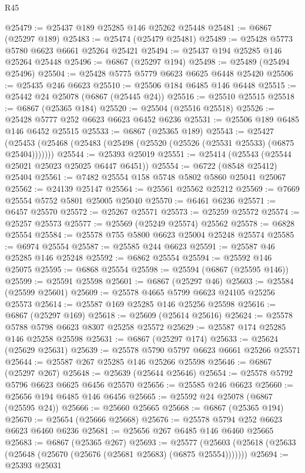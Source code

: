 \begin{lexlean}{R45}
\begin{coremodule}
{@25479 := @25437 @189 @25285 @146 @25262 @25448
@25481 := @6867 (@25297 @189)
@25483 := @25474 (@25479 @25481)
@25489 := @25428 @5773 @5780 @6623 @6661 @25264 @25421
@25494 := @25437 @194 @25285 @146 @25264 @25448
@25496 := @6867 (@25297 @194)
@25498 := @25489 (@25494 @25496)
@25504 := @25428 @5775 @5779 @6623 @6625 @6448 @25420
@25506 := @25435 @246 @6623
@25510 := @25506 @184 @6485 @146 @6448
@25515 := @25442 @24 @25078 (@6867 (@25445 @24))
@25516 := @25510 @25515
@25518 := @6867 (@25365 @184)
@25520 := @25504 (@25516 @25518)
@25526 := @25428 @5777 @252 @6623 @6623 @6452 @6236
@25531 := @25506 @189 @6485 @146 @6452 @25515
@25533 := @6867 (@25365 @189)
@25543 := @25427
    (@25453 (@25468 (@25483 (@25498 (@25520 (@25526 (@25531 @25533) (@6875 @25404)))))))
@25544 := @25393 @25019
@25551 := @25414 (@25543 (@25544 @25021 @25023 @25025 @6447 @6451))
@25554 := @6722 (@8548 @25412) @25404
@25561 := @7482 @25554 @158 @5748 @5802 @5860 @25041 @25067
@25562 := @24139 @25147
@25564 := @25561 @25562 @25212
@25569 := @7669 @25554 @5752 @5801 @25005 @25040
@25570 := @6461 @6236
@25571 := @6457 @25570
@25572 := @25267 @25571
@25573 := @25259 @25572
@25574 := @25257 @25573
@25577 := @25569 (@25249 @25574) @25562
@25578 := @6828 @25554
@25584 := @25578 @755 @5800 @6623 @25004 @25248 @25574
@25585 := @6974 @25554
@25587 := @25585 @244 @6623
@25591 := @25587 @46 @25285 @146 @25248
@25592 := @6862 @25554
@25594 := @25592 @146 @25075
@25595 := @6868 @25554
@25598 := @25594 (@6867 (@25595 @146))
@25599 := @25591 @25598
@25601 := @6867 (@25297 @46)
@25603 := @25584 (@25599 @25601)
@25609 := @25578 @4665 @5799 @6623 @24105 @25256 @25573
@25614 := @25587 @169 @25285 @146 @25256 @25598
@25616 := @6867 (@25297 @169)
@25618 := @25609 (@25614 @25616)
@25624 := @25578 @5788 @5798 @6623 @8307 @25258 @25572
@25629 := @25587 @174 @25285 @146 @25258 @25598
@25631 := @6867 (@25297 @174)
@25633 := @25624 (@25629 @25631)
@25639 := @25578 @5790 @5797 @6623 @6661 @25266 @25571
@25644 := @25587 @267 @25285 @146 @25266 @25598
@25646 := @6867 (@25297 @267)
@25648 := @25639 (@25644 @25646)
@25654 := @25578 @5792 @5796 @6623 @6625 @6456 @25570
@25656 := @25585 @246 @6623
@25660 := @25656 @194 @6485 @146 @6456
@25665 := @25592 @24 @25078 (@6867 (@25595 @24))
@25666 := @25660 @25665
@25668 := @6867 (@25365 @194)
@25670 := @25654 (@25666 @25668)
@25676 := @25578 @5794 @252 @6623 @6623 @6460 @6236
@25681 := @25656 @267 @6485 @146 @6460 @25665
@25683 := @6867 (@25365 @267)
@25693 := @25577
    (@25603 (@25618 (@25633 (@25648 (@25670 (@25676 (@25681 @25683) (@6875 @25554)))))))
@25694 := @25393 @25031
}
\end{coremodule}
\end{lexlean}
